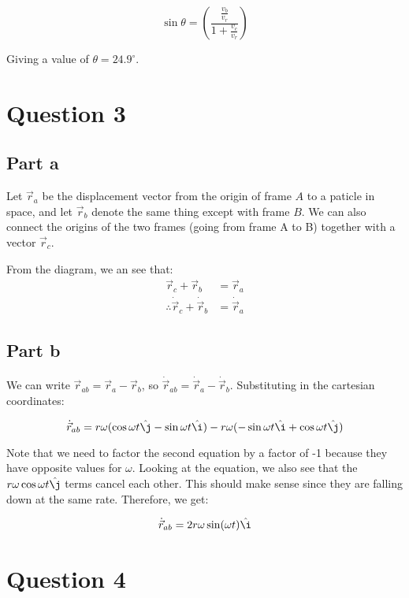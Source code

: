 \documentclass{article}
\theoremstyle{definition}
\numberwithin{equation}{section}
\numberwithin{definition}{section}
\begin{document}
	\[ \sin \theta = \left(\frac{\frac{v_b}{v_r}}{1 + \frac{v_c}{v_r}}\right)\]
	
	Giving a value of $\theta = 24.9^\circ$.
	
	\section{Question 3}
	
	\subsection{Part a}
	Let $\vec r_a$ be the displacement vector from the origin of frame $A$ to a paticle in space, and let $\vec r_b$ denote the same thing except with frame $B$. We can also connect the origins of the two frames (going from frame A to B) together with a vector $\vec r_c$. 
	
	From the diagram, we an see that:
	\begin{align*}
		\vec r_c + \vec r_b &= \vec r_a\\
		\therefore \dot {\vec r}_c + \dot {\vec r}_b &= \dot {\vec r}_a
		\end{align*}
	
	\subsection{Part b}
	
	We can write $\vec r_{ab} = \vec r_a - \vec r_b$, so $\dot \vec{r}_{ab} = \dot {\vec r}_a - \dot {\vec r}_b$. Substituting in the cartesian coordinates:

	
	\[ \dot {\vec{r}}_{ab} = r \omega (\cos \omega t \hat \j - \sin \omega t\hat \i) - r \omega (-\sin \omega t \hat \i + \cos \omega t \hat \j) \]
	
	Note that we need to factor the second equation by a factor of -1 because they have opposite values for $\omega$. Looking at the equation, we also see that the $r \omega \cos \omega t \hat \j$ terms cancel each other. This should make sense since they are falling down at the same rate. Therefore, we get:
	
	\[\dot{\vec r}_{ab} = 2r\omega \sin(\omega t) \hat \i\]
	
	\section{Question 4}
	
	
\end{document}
